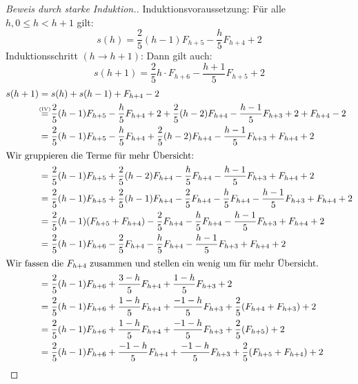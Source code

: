 \documentclass{scrartcl} %
\begin{document}
\begin{aufgabe}
\begin{enumerate}[label=(\alph*)]
\begin{proof}[Beweis durch starke Induktion.]
                Induktionsvoraussetzung: Für alle $h, 0 \leq h < h + 1$ gilt:
                \[
                    s(h) = \frac{2}{5}(h - 1) F_{h + 5} - \frac{h}{5}F_{h + 4} + 2
                \]
                Induktionsschritt $(h \to h + 1)$:
                Dann gilt auch:
                \[
                    s(h + 1) = \frac{2}{5}h\cdot F_{h + 6} - \frac{h + 1}{5}F_{h + 5} + 2
                \]
                \begin{align*}
                    s(h + 1) &= s(h) + s(h - 1) + F_{h + 4} - 2\\
                    &\stackrel{\mathclap{\text{\tiny (IV)}}}{=} \frac{2}{5}(h - 1) F_{h + 5} - \frac{h}{5}F_{h + 4} + 2 + \frac{2}{5}(h - 2) F_{h + 4} - \frac{h - 1}{5}F_{h + 3} + 2 + F_{h + 4} - 2\\
                    &= \frac{2}{5}(h - 1) F_{h + 5} - \frac{h}{5}F_{h + 4} + \frac{2}{5}(h - 2) F_{h + 4} - \frac{h - 1}{5}F_{h + 3} + F_{h + 4} + 2\\
                    \intertext{Wir gruppieren die Terme für mehr Übersicht:}
                    &= \frac{2}{5}(h - 1) F_{h + 5} + \frac{2}{5}(h - 2)F_{h + 4} - \frac{h}{5}F_{h + 4} - \frac{h - 1}{5}F_{h + 3} + F_{h + 4} + 2\\
                    &= \frac{2}{5}(h - 1) F_{h + 5} + \frac{2}{5}(h - 1)F_{h + 4} - \frac{2}{5}F_{h + 4} - \frac{h}{5}F_{h + 4} - \frac{h - 1}{5}F_{h + 3} + F_{h + 4} + 2\\
                    &= \frac{2}{5}(h - 1)(F_{h + 5} + F_{h + 4}) - \frac{2}{5}F_{h + 4} - \frac{h}{5}F_{h + 4} - \frac{h - 1}{5}F_{h + 3} + F_{h + 4} + 2\\
                    &= \frac{2}{5}(h - 1)F_{h + 6} - \frac{2}{5}F_{h + 4} - \frac{h}{5}F_{h + 4} - \frac{h - 1}{5}F_{h + 3} + F_{h + 4} + 2\\
                    \intertext{Wir fassen die $F_{h + 4}$ zusammen und stellen ein wenig um für mehr Übersicht.}
                    &= \frac{2}{5}(h - 1)F_{h + 6} + \frac{3 - h}{5}F_{h + 4} + \frac{1 - h}{5}F_{h + 3} + 2\\
                    &= \frac{2}{5}(h - 1)F_{h + 6} + \frac{1 - h}{5}F_{h + 4} + \frac{-1 - h}{5}F_{h + 3} + \frac{2}{5}(F_{h + 4} + F_{h + 3}) + 2\\
                    &= \frac{2}{5}(h - 1)F_{h + 6} + \frac{1 - h}{5}F_{h + 4} + \frac{-1 - h}{5}F_{h + 3} + \frac{2}{5}(F_{h + 5}) + 2\\
                    &= \frac{2}{5}(h - 1)F_{h + 6} + \frac{-1 - h}{5}F_{h + 4} + \frac{-1 - h}{5}F_{h + 3} + \frac{2}{5}(F_{h + 5} + F_{h + 4}) + 2\\

\end{align*}
\end{proof}
\end{enumerate}
\end{aufgabe}
\end{document}
